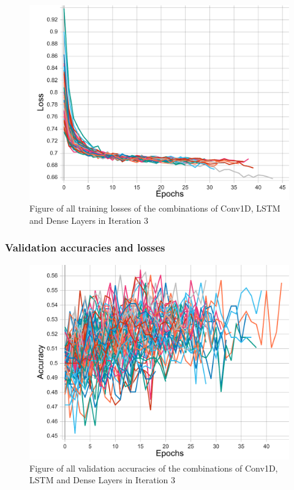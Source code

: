 \begin{figure}[ht]
    \centering
    \includegraphics[width=0.95\columnwidth]{figures/results/cnnlstm/cnnlstm_all_loss_t.pdf}
    \caption[Training losses for Iteration 3]{Figure of all training losses of the combinations of Conv1D, LSTM and Dense Layers in Iteration 3}
    \label{fig:iteration3_train_loss}
\end{figure}
\FloatBarrier

\subsubsection{Validation accuracies and losses}
\begin{figure}[ht]
    \centering
    \includegraphics[width=0.95\columnwidth]{figures/results/cnnlstm/cnnlstm_all_acc.pdf}
    \caption[Validation accuracies for Iteration 3]{Figure of all validation accuracies of the combinations of Conv1D, LSTM and Dense Layers in Iteration 3}
    \label{fig:iteration3_all_accuracy}
\end{figure}
\FloatBarrier

